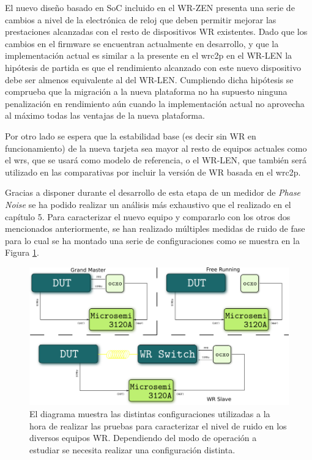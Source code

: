 El nuevo diseño basado en SoC incluido en el WR-ZEN presenta una serie de 
cambios a nivel de la electrónica de reloj que deben permitir mejorar las 
prestaciones alcanzadas con el resto de dispositivos WR existentes. Dado que 
los cambios en el firmware se encuentran actualmente en desarrollo, y que la 
implementación actual es similar a la presente en el \gls{wrc2p} en el WR-LEN 
la hipótesis de partida es que el rendimiento alcanzado con este nuevo 
dispositivo debe ser almenos equivalente al del WR-LEN. Cumpliendo dicha 
hipótesis se comprueba que la migración a la nueva plataforma no ha supuesto 
ninguna penalización en rendimiento aún cuando la implementación actual no 
aprovecha al máximo todas las ventajas de la nueva plataforma.

Por otro lado se espera que la estabilidad base (es decir sin WR en 
funcionamiento) de la nueva tarjeta sea mayor al resto de equipos actuales como 
el \gls{wrs}, que se usará como modelo de referencia, o el WR-LEN, que también 
será utilizado en las comparativas por incluir la versión de WR basada en el 
\gls{wrc2p}.

Gracias a disponer durante el desarrollo de esta etapa de un medidor de 
\textit{Phase Noise} se ha podido realizar un análisis más exhaustivo que el 
realizado en el capítulo 5. Para caracterizar el nuevo equipo y compararlo con 
los otros dos mencionados anteriormente, se han realizado múltiples medidas de 
ruido de fase para lo cual se ha montado una serie de configuraciones como se 
muestra en la Figura \ref{fig:pnsetup}.




\begin{figure}
	\centering
	\includegraphics[width=0.7\linewidth]{imagenes/pn_setup}
	\caption[Descripción de la configuración para las pruebas de Phase 
	Noise]{El diagrama muestra las distintas configuraciones utilizadas a la 
	hora de realizar las pruebas para caracterizar el nivel de ruido en los 
	diversos equipos WR. Dependiendo del modo de operación a estudiar se 
	necesita realizar una configuración distinta.}
	\label{fig:pnsetup}
\end{figure}

